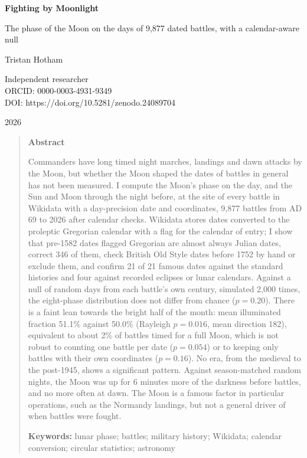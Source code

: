 \documentclass[11pt,a4paper]{article}
\begin{document}
\begin{center}
{\Large\bfseries Fighting by Moonlight\par}
\vspace{0.4em}
{\large The phase of the Moon on the days of 9,877 dated battles, with a calendar-aware null\par}
\vspace{1.2em}
{\large Tristan Hotham\par}
\vspace{0.3em}
{\small Independent researcher\\
ORCID: 0000-0003-4931-9349\\
DOI: https://doi.org/10.5281/zenodo.24089704\par}
\vspace{0.8em}
2026
\end{center}

\begin{quote}
\small
\begin{center}\textbf{Abstract}\end{center}
Commanders have long timed night marches, landings and dawn attacks by the Moon, but whether the Moon shaped the dates of battles in general has not been measured. I compute the Moon's phase on the day, and the Sun and Moon through the night before, at the site of every battle in Wikidata with a day-precision date and coordinates, 9,877 battles from AD 69 to 2026 after calendar checks. Wikidata stores dates converted to the proleptic Gregorian calendar with a flag for the calendar of entry; I show that pre-1582 dates flagged Gregorian are almost always Julian dates, correct 346 of them, check British Old Style dates before 1752 by hand or exclude them, and confirm 21 of 21 famous dates against the standard histories and four against recorded eclipses or lunar calendars. Against a null of random days from each battle's own century, simulated 2,000 times, the eight-phase distribution does not differ from chance ($p=0.20$). There is a faint lean towards the bright half of the month: mean illuminated fraction 51.1\% against 50.0\% (Rayleigh $p=0.016$, mean direction 182\textdegree), equivalent to about 2\% of battles timed for a full Moon, which is not robust to counting one battle per date ($p=0.054$) or to keeping only battles with their own coordinates ($p=0.16$). No era, from the medieval to the post-1945, shows a significant pattern. Against season-matched random nights, the Moon was up for 6 minutes more of the darkness before battles, and no more often at dawn. The Moon is a famous factor in particular operations, such as the Normandy landings, but not a general driver of when battles were fought.

\textbf{Keywords:} lunar phase; battles; military history; Wikidata; calendar conversion; circular statistics; astronomy
\end{quote}
\end{document}
